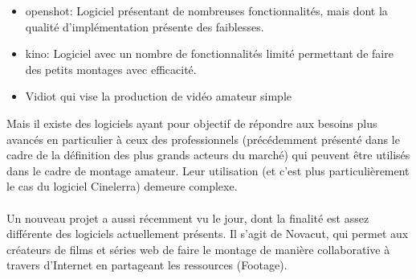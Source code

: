 \begin {itemize}

  \item {openshot: Logiciel présentant  de nombreuses fonctionnalités,
  mais dont la
    qualité d'implémentation présente des faiblesses.}

  \item {kino: Logiciel avec un nombre de fonctionnalités limité
  permettant de faire des petits montages avec efficacité.}

  \item {Vidiot qui vise la production de vidéo amateur simple}

\end {itemize}

Mais il existe des logiciels ayant pour objectif de répondre aux besoins
plus avancés en particulier à ceux des professionnels (précédemment
présenté dans le cadre de la définition des plus grands acteurs du
marché) qui peuvent être utilisés dans le cadre de montage amateur.
Leur utilisation (et c'est plus particulièrement le cas du logiciel
Cinelerra) demeure complexe.

\paragraph{}

Un nouveau projet a aussi récemment vu le jour, dont la finalité est
assez différente des logiciels actuellement présents. Il s'agit de
Novacut, qui permet aux créateurs de films et séries web de faire le
montage de manière collaborative à travers d'Internet en partageant
les ressources (Footage).

\paragraph{}







